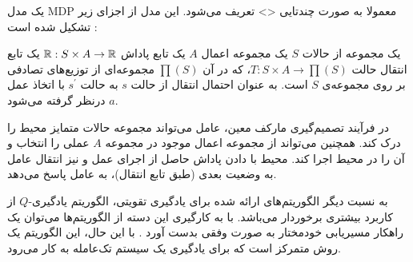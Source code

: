 یک مدل MDP معمولا به صورت چندتایی <> تعریف می‌شود. این مدل از اجزای زیر
تشکیل شده است \cite{Kaelbling1996}:


  یک مجموعه از حالات $S$
  یک مجموعه اعمال $A$
 یک تابع پاداش ${\Bbb R}: S \times A \rightarrow {\Bbb R}$
 یک تابع انتقال حالت $T: S \times A \rightarrow \prod(S)$، که در آن $\prod(S)$ مجموعه‌ای از توزیع‌های تصادفی بر
روی مجموعه‌ی $S$ است.  به عنوان احتمال انتقال از حالت $s$ به حالت $s^{\prime}$ با اتخاذ عمل $a$ درنظر گرفته می‌شود.


در فرآیند تصمیم‌گیری مارکف معین، عامل می‌تواند مجموعه حالات متمایز محیط را درک کند. همچنین می‌تواند از مجموعه اعمال موجود در مجموعه $A$ عملی را انتخاب و آن را در محیط اجرا کند. محیط با دادن پاداش حاصل از اجرای عمل و نیز انتقال عامل به وضعیت بعدی (طبق تابع انتقال)، به عامل پاسخ می‌دهد.

به نسبت دیگر الگوریتم‌های ارائه شده برای یادگیری تقویتی، الگوریتم یادگیری-$Q$ از کاربرد بیشتری برخوردار می‌باشد. با به کارگیری این دسته از الگوریتم‌ها می‌توان یک راهکار مسیریابی خودمختار به صورت وفقی بدست آورد \cite{Nedzelnitsky1987}. با این حال، این الگوریتم یک روش متمرکز است که برای
یادگیری یک سیستم تک‌عامله به کار می‌رود.



